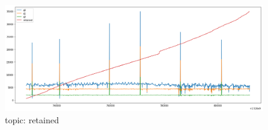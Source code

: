 \documentclass[12pt, letterpaper]{article}
\begin{document}
\begin{figure}
	\setlength{\tabcolsep}{0pt}
	\caption{topic: retained}
	\label{f:valid_cnt_retained}
	\begin{center}
		\includegraphics[width=\textwidth]{valid_cnt/valid_cnt-retained}	
	\end{center}
\end{figure}
\end{document}
